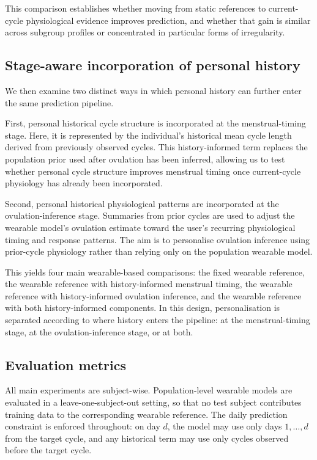 \documentclass[conference]{IEEEtran}
\begin{document}
This comparison establishes whether moving from static references to current-cycle physiological evidence improves prediction, and whether that gain is similar across subgroup profiles or concentrated in particular forms of irregularity.

\subsection{Stage-aware incorporation of personal history}

We then examine two distinct ways in which personal history can further enter the same prediction pipeline.

First, personal historical cycle structure is incorporated at the menstrual-timing stage. Here, it is represented by the individual's historical mean cycle length derived from previously observed cycles. This history-informed term replaces the population prior used after ovulation has been inferred, allowing us to test whether personal cycle structure improves menstrual timing once current-cycle physiology has already been incorporated.

Second, personal historical physiological patterns are incorporated at the ovulation-inference stage. Summaries from prior cycles are used to adjust the wearable model's ovulation estimate toward the user's recurring physiological timing and response patterns. The aim is to personalise ovulation inference using prior-cycle physiology rather than relying only on the population wearable model.

This yields four main wearable-based comparisons: the fixed wearable reference, the wearable reference with history-informed menstrual timing, the wearable reference with history-informed ovulation inference, and the wearable reference with both history-informed components. In this design, personalisation is separated according to where history enters the pipeline: at the menstrual-timing stage, at the ovulation-inference stage, or at both.

\subsection{Evaluation metrics}

All main experiments are subject-wise. Population-level wearable models are evaluated in a leave-one-subject-out setting, so that no test subject contributes training data to the corresponding wearable reference. The daily prediction constraint is enforced throughout: on day $d$, the model may use only days $1,\ldots,d$ from the target cycle, and any historical term may use only cycles observed before the target cycle.
\end{document}
